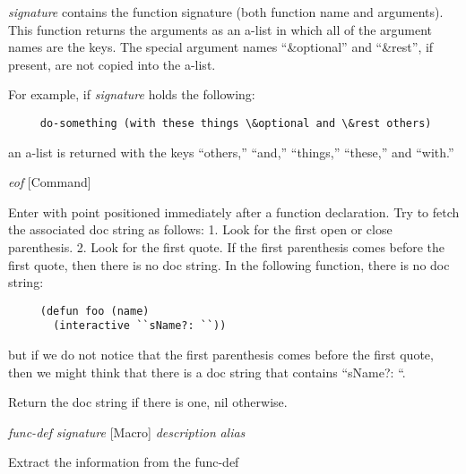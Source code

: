\begin{doc-string}
\emph{signature} contains the function signature (both function name and arguments).
This function returns the arguments as an a-list in which all of the argument
names are the keys.  The special argument names ``\&optional'' and ``\&rest'', if
present, are not copied into the a-list.

For example, if \emph{signature} holds the following:

\small{\begin{verbatim}
     do-something (with these things \&optional and \&rest others)
\end{verbatim}}

an a-list is returned with the keys ``others,'' ``and,'' ``things,'' ``these,'' and
``with.''
\end{doc-string}

\vspace{1em}
\noindent
{}
\usebox{\funcname}\emph{eof}
 \hfill [Command]

\begin{doc-string}
Enter with point positioned immediately after a function declaration.  Try to
fetch the associated doc string as follows:  1. Look for the first open or close
parenthesis.  2. Look for the first quote.  If the first parenthesis comes before
the first quote, then there is no doc string.  In the following function, there is
no doc string:

\small{\begin{verbatim}
     (defun foo (name)
       (interactive ``sName?: ``))
\end{verbatim}}

but if we do not notice that the first parenthesis comes before the first quote, then
we might think that there is a doc string that contains ``sName?: ``.

Return the doc string if there is one, nil otherwise.
\end{doc-string}

\vspace{1em}
\noindent
{}
\usebox{\funcname}\emph{func-def} \emph{signature}
 \hfill [Macro]
\hspace*{\wd\funcname}\emph{description} \emph{alias}

\begin{doc-string}
Extract the information from the func-def
\end{doc-string}

